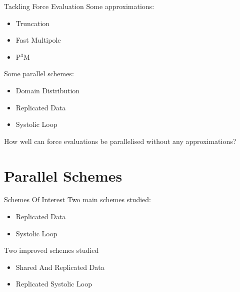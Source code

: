\documentclass[xcolor={usenames, svgnames}]{beamer}
\begin{document}
\begin{frame}{Tackling Force Evaluation}
    Some approximations:
    \begin{itemize}
        \item Truncation
        \item Fast Multipole
        \item P${}^3$M
    \end{itemize}

    Some parallel schemes:
    \begin{itemize}
        \item Domain Distribution
        \item Replicated Data
        \item Systolic Loop
    \end{itemize}

    How well can force evaluations be parallelised without
    any approximations?
\end{frame}


\section{Parallel Schemes}

\begin{frame}{Schemes Of Interest}
    Two main schemes studied:
    \begin{itemize}
        \item Replicated Data
        \item Systolic Loop
    \end{itemize}

    Two improved schemes studied
    \begin{itemize}
        \item Shared And Replicated Data
        \item Replicated Systolic Loop
    \end{itemize}
\end{frame}


\newcommand{\rdpic}{
    \begin{center}
        \scalebox{0.75}{
            \begin{tikzpicture}[scale=.5]
                \foreach \n in {0,...,3} {
                    \draw [block] (6*\n,0) rectangle (6*\n+4,4);
                    \draw [block, redfill] (6*\n,\n) rectangle (6*\n+4,\n+1);
                }
                \foreach \n in {0,...,2} {
                    \draw [latex'-latex', thick] (6*\n+4.2,2) -- (6*\n+5.8,2);
                }
                \foreach \n in {0,...,3} {
                    \node at (2 + 6*\n, -1) {\n};
                }
            \end{tikzpicture}
        }
    \end{center}
}
\end{document}
